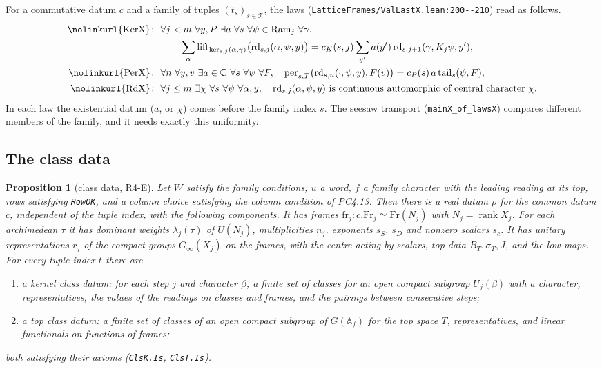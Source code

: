 \documentclass[11pt]{article}
\newcommand{\lean}[1]{\nolinkurl{#1}}
\newcommand{\Lpath}[1]{\nolinkurl{#1}}
\newtheorem{proposition}{Proposition}
\theoremstyle{remark}
\begin{document}
For a commutative datum $c$ and a family of tuples $(t_s)_{s\in\mathcal T}$, the laws (\Lpath{LatticeFrames/ValLastX.lean:200--210}) read as follows.
\begin{align*}
\text{\lean{KerX}}\colon\ &\forall j<m\ \forall y,P\ \exists a\ \forall s\ \forall\psi\in\mathrm{Ram}_j\ \forall\gamma,\\
&\qquad\sum_\alpha \mathrm{lift}_{\ker_{s,j}(\alpha,\gamma)}\bigl(\mathrm{rd}_{s,j}(\alpha,\psi,y)\bigr)=c_K(s,j)\sum_{y'}a(y')\,\mathrm{rd}_{s,j+1}(\gamma,K_j\psi,y'),\\
\text{\lean{PerX}}\colon\ &\forall n\ \forall y,v\ \exists a\in\mathbb C\ \forall s\ \forall\psi\ \forall F,\quad \mathrm{per}_{s,T}\bigl(\mathrm{rd}_{s,n}(\cdot,\psi,y),F(v)\bigr)=c_P(s)\,a\,\mathrm{tail}_s(\psi,F),\\
\text{\lean{RdX}}\colon\ &\forall j\le m\ \exists\chi\ \forall s\ \forall\psi\ \forall\alpha,y,\quad \mathrm{rd}_{s,j}(\alpha,\psi,y)\ \text{is continuous automorphic of central character}\ \chi.
\end{align*}
In each law the existential datum ($a$, or $\chi$) comes before the family index $s$. The seesaw transport (\lean{mainX_of_lawsX}) compares different members of the family, and it needs exactly this uniformity.

\subsection{The class data}

\begin{proposition}[class data, R4-E]\label{prop:C}
Let $W$ satisfy the family conditions, $u$ a word, $f$ a family character with the leading reading at its top, rows satisfying \lean{RowOK}, and a column choice satisfying the column condition of PC4.13. Then there is a real datum $\rho$ for the common datum $c$, independent of the tuple index, with the following components. It has frames $\mathrm{fr}_j\colon c.\mathrm{Fr}_j\simeq\mathrm{Fr}(N_j)$ with $N_j=\operatorname{rank}X_j$. For each archimedean $\tau$ it has dominant weights $\lambda_j(\tau)$ of $U(N_j)$, multiplicities $n_j$, exponents $s_S$, $s_D$ and nonzero scalars $s_c$. It has unitary representations $r_j$ of the compact groups $G_\infty(X_j)$ on the frames, with the centre acting by scalars, top data $B_T,\sigma_T,J$, and the low maps. For every tuple index $t$ there are
\begin{enumerate}[label=(\roman*)]
\item a kernel class datum: for each step $j$ and character $\beta$, a finite set of classes for an open compact subgroup $U_j(\beta)$ with a character, representatives, the values of the readings on classes and frames, and the pairings between consecutive steps;
\item a top class datum: a finite set of classes of an open compact subgroup of $G(\mathbb A_f)$ for the top space $T$, representatives, and linear functionals on functions of frames;
\end{enumerate}
both satisfying their axioms (\lean{ClsK.Is}, \lean{ClsT.Is}).
\end{proposition}
\end{document}
